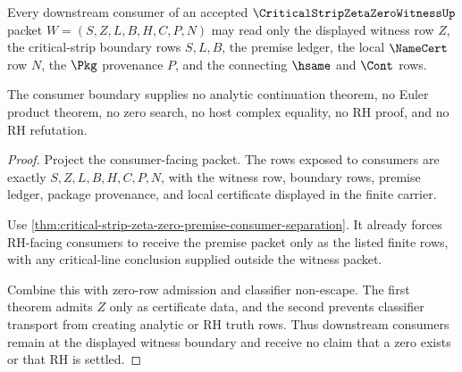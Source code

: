 \begin{theorem}
\label{thm:critical-strip-zeta-zero-witness-consumer-boundary}
Every downstream consumer of an accepted $\CriticalStripZetaZeroWitnessUp$ packet $W=(S,Z,L,B,H,C,P,N)$ may read only the displayed witness row $Z$, the critical-strip boundary rows $S,L,B$, the premise ledger, the local $\NameCert$ row $N$, the $\Pkg$ provenance $P$, and the connecting $\hsame$ and $\Cont$ rows.

The consumer boundary supplies no analytic continuation theorem, no Euler product theorem, no zero search, no host complex equality, no RH proof, and no RH refutation.
\end{theorem}
\begin{proof}
Project the consumer-facing packet. The rows exposed to consumers are exactly $S,Z,L,B,H,C,P,N$, with the witness row, boundary rows, premise ledger, package provenance, and local certificate displayed in the finite carrier.

Use \autoref{thm:critical-strip-zeta-zero-premise-consumer-separation}. It already forces RH-facing consumers to receive the premise packet only as the listed finite rows, with any critical-line conclusion supplied outside the witness packet.

Combine this with zero-row admission and classifier non-escape. The first theorem admits $Z$ only as certificate data, and the second prevents classifier transport from creating analytic or RH truth rows. Thus downstream consumers remain at the displayed witness boundary and receive no claim that a zero exists or that RH is settled.
\end{proof}

